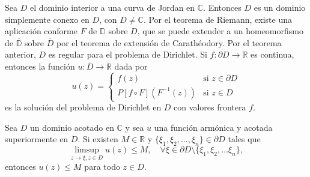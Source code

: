 Sea $D$ el dominio interior a una curva de Jordan en $\mathbb{C}$.
Entonces $D$ es un dominio simplemente conexo en $D$, con $D \neq \mathbb{C}$.
Por el teorema de Riemann, existe una aplicación conforme $F$ de $\mathbb{D}$ sobre $D$, que se puede extender a un homeomorfismo de $\overline{\mathbb{D}}$ sobre $\overline{D}$ por el teorema de extensión de Carathéodory.
Por el teorema anterior, $D$ es regular para el problema de Dirichlet.
Si $f: \partial D \to \mathbb{R}$ es continua, entonces la función $u: \overline{D} \to \mathbb{R}$ dada por
$$u(z) = \begin{cases}
        f(z)                    & \text{si } z \in \partial D \\
        P[f \circ F](F^{-1}(z)) & \text{si } z \in D
    \end{cases}$$
es la solución del problema de Dirichlet en $D$ con valores frontera $f$.

\begin{theorem}
    Sea $D$ un dominio acotado en $\mathbb{C}$ y sea $u$ una función armónica y acotada superiormente en $D$.
    Si existen $M \in \mathbb{R}$ y $\{\xi_1, \xi_2, \dots, \xi_n\} \in \partial D$ tales que
    $$\limsup_{z \to \xi, z \in D} u(z) \leq M, \quad \forall \xi \in \partial D \setminus \{\xi_1, \xi_2, \dots \xi_n\},$$
    entonces $u(z) \leq M$ para todo $z \in D$.
\end{theorem}

